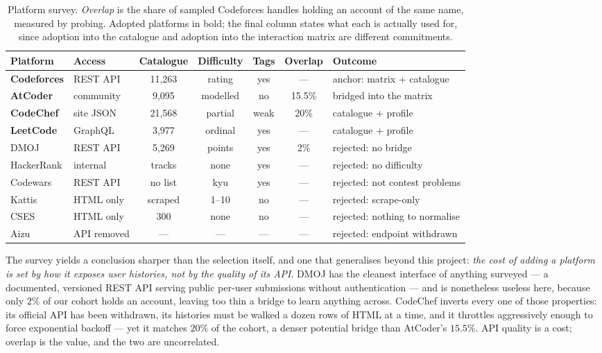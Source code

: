 \documentclass[12pt,a4paper]{article}
\begin{document}
\begin{table}[h]
\centering
\caption{Platform survey. \emph{Overlap} is the share of sampled Codeforces handles
holding an account of the same name, measured by probing. Adopted platforms in bold; the
final column states what each is actually used for, since adoption into the catalogue and
adoption into the interaction matrix are different commitments.}
\label{tab:platforms}
\small
\begin{tabular}{llccccl}
\toprule
Platform & Access & Catalogue & Difficulty & Tags & Overlap & Outcome \\
\midrule
\textbf{Codeforces} & REST API  & 11{,}263 & rating   & yes  & ---   & anchor: matrix + catalogue \\
\textbf{AtCoder}    & community & 9{,}095  & modelled & no   & 15.5\% & bridged into the matrix \\
\textbf{CodeChef}   & site JSON & 21{,}568 & partial  & weak & 20\%  & catalogue + profile \\
\textbf{LeetCode}   & GraphQL   & 3{,}977  & ordinal  & yes  & ---   & catalogue + profile \\
\midrule
DMOJ        & REST API    & 5{,}269 & points & yes & 2\% & rejected: no bridge \\
HackerRank  & internal    & tracks  & none   & yes & --- & rejected: no difficulty \\
Codewars    & REST API    & no list & kyu    & yes & --- & rejected: not contest problems \\
Kattis      & HTML only   & scraped & 1--10  & no  & --- & rejected: scrape-only \\
CSES        & HTML only   & 300     & none   & no  & --- & rejected: nothing to normalise \\
Aizu        & API removed & ---     & ---    & --- & --- & rejected: endpoint withdrawn \\
\bottomrule
\end{tabular}
\end{table}

The survey yields a conclusion sharper than the selection itself, and one that
generalises beyond this project: \emph{the cost of adding a platform is set by how it
exposes user histories, not by the quality of its API}. DMOJ has the cleanest interface
of anything surveyed --- a documented, versioned REST API serving public per-user
submissions without authentication --- and is nonetheless useless here, because only
$2\%$ of our cohort holds an account, leaving too thin a bridge to learn anything
across. CodeChef inverts every one of those properties: its official API has been
withdrawn, its histories must be walked a dozen rows of HTML at a time, and it throttles
aggressively enough to force exponential backoff --- yet it matches $20\%$ of the cohort,
a denser potential bridge than AtCoder's $15.5\%$. API quality is a cost; overlap is the
value, and the two are uncorrelated.
\end{document}
